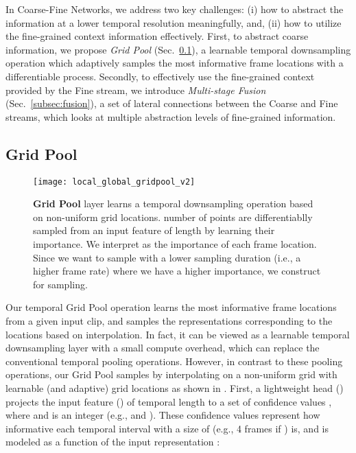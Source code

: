\documentclass[final]{cvpr}
\newcommand{\sref}[1]{Sec.~\ref{#1}}
\begin{document}
In Coarse-Fine Networks, we address two key challenges: (i) how to abstract the information at a lower temporal resolution meaningfully, and, (ii) how to utilize the fine-grained context information effectively. First, to abstract coarse information, we propose \textit{Grid Pool} (\sref{subsec:gridpool}), a learnable temporal downsampling operation which adaptively samples the most informative frame locations with a differentiable process.
Secondly, to effectively use the fine-grained context provided by the Fine stream, we introduce \textit{Multi-stage Fusion} (\sref{subsec:fusion}), a set of lateral connections between the Coarse and Fine streams, which looks at multiple abstraction levels of fine-grained information. 

\vspace{-2mm}
\subsection{Grid Pool}
\label{subsec:gridpool}
\vspace{-1mm}

\begin{figure}[t]
	\centering
\texttt{[image: local\_global\_gridpool\_v2]}
\caption{\textbf{Grid Pool} layer learns a temporal downsampling operation based on non-uniform grid locations.  number of points are differentiablly sampled from an input feature of length  by learning their importance. We interpret  as the importance of each frame location. Since we want to sample with a lower sampling duration (i.e., a higher frame rate) where we have a higher importance, we construct  for sampling.} \vspace{-4mm}
	\label{fig:grid}
\end{figure}


Our temporal Grid Pool operation learns the most informative frame locations from a given input clip, and samples the representations corresponding to the locations based on interpolation. In fact, it can be viewed as a learnable temporal downsampling layer with a small compute overhead, which can replace the conventional temporal pooling operations. However, in contrast to these pooling operations, our Grid Pool samples by interpolating on a non-uniform grid with learnable (and adaptive) grid locations as shown in . First, a lightweight head () projects the input feature () of temporal length  to a set of confidence values , where  and  is an integer (e.g.,  and ). These confidence values represent how informative each temporal interval with a size of  (e.g., 4 frames if ) is, and is modeled as a function of the input representation :
\end{document}
